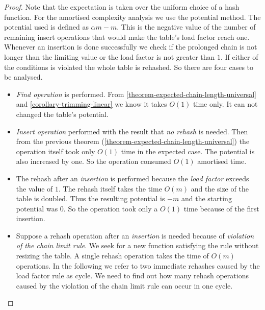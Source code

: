 \begin{proof}
Note that the expectation is taken over the uniform choice of a hash function. For the amortised complexity analysis we use the potential method. The potential used is defined as $\alpha m - m$. This is the negative value of the number of remaining insert operations that would make the table's load factor reach one. Whenever an insertion is done successfully we check if the prolonged chain is not longer than the limiting value or the load factor is not greater than $1$. If either of the conditions is violated the whole table is rehashed. So there are four cases to be analysed.
\begin{itemize}
\item \emph{Find operation} is performed. From \ref{theorem-expected-chain-length-universal} and \ref{corollary-trimming-linear} we know it takes $O(1)$ time only. It can not changed the table's potential.

\item \emph{Insert operation} performed with the result that \emph{no rehash} is needed. Then from the previous theorem (\ref{theorem-expected-chain-length-universal}) the operation itself took only $O(1)$ time in the expected case. The potential is also increased by one. So the operation consumed $O(1)$ amortised time.

\item The rehash after an \emph{insertion} is performed because the \emph{load factor} exceeds the value of $1$. The rehash itself takes the time $O(m)$ and the size of the table is doubled. Thus the resulting potential is $-m$ and the starting potential was $0$. So the operation took only a $O(1)$ time because of the first insertion.

\item Suppose a rehash operation after an \emph{insertion} is needed because of \emph{violation of the chain limit rule}. We seek for a new function satisfying the rule without resizing the table. A single rehash operation takes the time of $O(m)$ operations. In the following we refer to two immediate rehashes caused by the load factor rule as cycle. We need to find out how many rehash operations caused by the violation of the chain limit rule can occur in one cycle. 


\end{itemize}
\end{proof}
